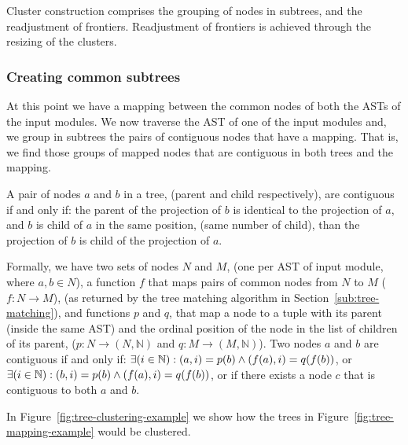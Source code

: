 Cluster construction comprises the grouping of nodes in subtrees,
and the readjustment of frontiers. Readjustment of frontiers is achieved
through the resizing of the clusters.


\subsubsection{Creating common subtrees}

At this point we have a mapping between the common nodes of both the
ASTs of the input modules. We now traverse the AST of one of the input
modules and, we group in subtrees the pairs of contiguous nodes that
have a mapping. That is, we find those groups of mapped nodes that
are contiguous in both trees and the mapping.

A pair of nodes $a$ and $b$ in a tree, (parent and child respectively),
are contiguous if and only if: the parent of the projection of $b$
is identical to the projection of $a$, and $b$ is child of $a$
in the same position, (same number of child), than the projection
of $b$ is child of the projection of $a$.

Formally, we have two sets of nodes $N$ and $M$, (one per AST of
input module, where $a,b\in N$), a function $f$ that maps pairs
of common nodes from $N$ to $M$ ($f:N\rightarrow M$), (as returned
by the tree matching algorithm in Section~\ref{sub:tree-matching}),
and functions $p$ and $q$, that map a node to a tuple with its parent
(inside the same AST) and the ordinal position of the node in the
list of children of its parent, ($p:N\rightarrow(N,\mathbb{N})$ and
$q:M\rightarrow(M,\mathbb{N})$). Two nodes $a$ and $b$ are contiguous
if and only if: $\exists(i\in\text{\ensuremath{\mathbb{N}})}:(a,i)=p(b)\land(f(a),i)=q(f(b))$,
or $\exists(i\in\text{\ensuremath{\mathbb{N}})}:(b,i)=p(b)\land(f(a),i)=q(f(b))$,
or if there exists a node $c$ that is contiguous to both $a$ and
$b$.

In Figure~\ref{fig:tree-clustering-example} we show how the trees
in Figure~\ref{fig:tree-mapping-example} would be clustered.

